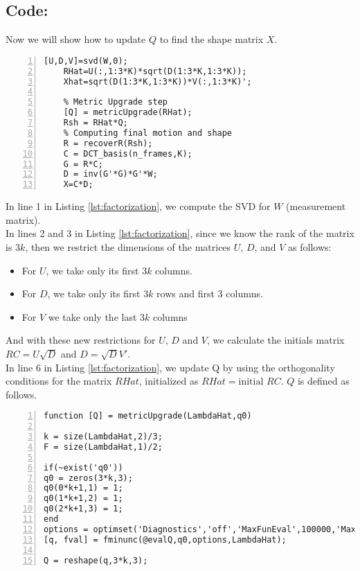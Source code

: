 \subsection{Code:}
\noindent Now we will show how to update $Q$ to find the shape matrix $X$.
\begin{lstlisting}[style=Matlab-editor, numbers=left, caption={Factorization method}, captionpos=b, label={lst:factorization}]
	[U,D,V]=svd(W,0);
	RHat=U(:,1:3*K)*sqrt(D(1:3*K,1:3*K));
	Xhat=sqrt(D(1:3*K,1:3*K))*V(:,1:3*K)';    
	
	% Metric Upgrade step
	[Q] = metricUpgrade(RHat);
	Rsh = RHat*Q;
	% Computing final motion and shape
	R = recoverR(Rsh);
	C = DCT_basis(n_frames,K);
	G = R*C;
	D = inv(G'*G)*G'*W;
	X=C*D;
\end{lstlisting}
\noindent In line 1 in Listing \ref{lst:factorization}, we compute the SVD for $W$ (measurement matrix).\\ 
\noindent In lines 2 and 3 in Listing \ref{lst:factorization}, since we know the rank of the matrix is $3k$, then we restrict the dimensions of the matrices $U$, $D$, and $V$ as follows:
\begin{itemize}
	\item For $U$, we take only its first $3k$ columns.
	\item For $D$, we take only its first $3k$ rows and first 3 columns.
	\item For $V$ we take only the last $3k$ columns
\end{itemize}
\noindent And with these new restrictions for $U$, $D$ and $V$, we calculate the initials matrix $RC=U\sqrt{D}$ and $D=\sqrt{D}V'$.\\
\noindent In line 6 in Listing \ref{lst:factorization}, we update Q by using the orthogonality conditions for the matrix $RHat$, initialized as $RHat=\text{initial } RC$. $Q$ is defined as follows.

\begin{lstlisting}[style=Matlab-editor, numbers=left, caption={Update function}, captionpos=b, label={lst:updatefunct}]
function [Q] = metricUpgrade(LambdaHat,q0)

k = size(LambdaHat,2)/3;
F = size(LambdaHat,1)/2;

if(~exist('q0'))
q0 = zeros(3*k,3);
q0(0*k+1,1) = 1;
q0(1*k+1,2) = 1;
q0(2*k+1,3) = 1;
end
options = optimset('Diagnostics','off','MaxFunEval',100000,'MaxIter',2000,'TolFun',1e-10,'TolX',1e-10);
[q, fval] = fminunc(@evalQ,q0,options,LambdaHat); 

Q = reshape(q,3*k,3);
\end{lstlisting}

